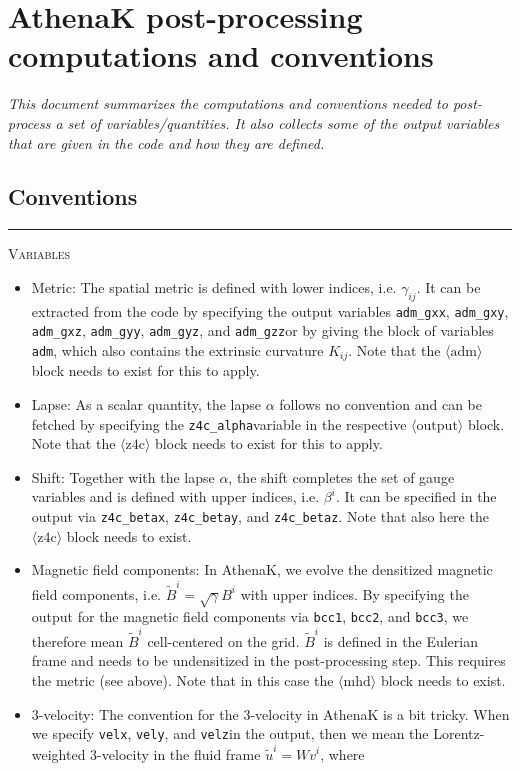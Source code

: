 \documentclass{article}
\newcommand{\var}[1]{%
  {\setlength{\fboxsep}{1.5pt}%
   \colorbox{varbg}{\textcolor{varfg}{\texttt{\small #1}}}}}
\newcommand{\step}[1]{%
  \par\medskip\noindent
  {\color{stepfg}\rule[-0.15ex]{2pt}{1.5ex}\hspace{0.5em}\scshape #1}%
  \hspace{0.75em}\ignorespaces}
\newcommand{\gxx}{\var{adm\_gxx}}
\newcommand{\gxy}{\var{adm\_gxy}}
\newcommand{\gxz}{\var{adm\_gxz}}
\newcommand{\gyy}{\var{adm\_gyy}}
\newcommand{\gyz}{\var{adm\_gyz}}
\newcommand{\gzz}{\var{adm\_gzz}}
\newcommand{\vx}{\var{velx}}
\newcommand{\vy}{\var{vely}}
\newcommand{\vz}{\var{velz}}
\newcommand{\alp}{\var{z4c\_alpha}}
\newcommand{\betx}{\var{z4c\_betax}}
\newcommand{\bety}{\var{z4c\_betay}}
\newcommand{\betz}{\var{z4c\_betaz}}
\newcommand{\Bx}{\var{bcc1}}
\newcommand{\By}{\var{bcc2}}
\newcommand{\Bz}{\var{bcc3}}
\begin{document}
\section*{AthenaK post-processing computations and conventions}
\textit{This document summarizes the computations and conventions needed
to post-process a set of variables/quantities. It also collects some of the output
variables that are given in the code and how they are defined.}

\subsection*{Conventions}
\step{Variables}
\begin{itemize}
  \item Metric: The spatial metric is defined with lower indices, i.e. $\gamma_{ij}$. It can be
  extracted from the code by specifying the output variables \gxx, \gxy, \gxz,
  \gyy, \gyz, and \gzz or by giving the block of variables \var{adm}, which
  also contains the extrinsic curvature $K_{ij}$. Note that the $\langle\mathrm{adm}\rangle$
  block needs to exist for this to apply.
  \item Lapse: As a scalar quantity, the lapse $\alpha$ follows no convention and can be fetched by specifying
  the \alp variable in the respective $\langle\mathrm{output}\rangle$ block. Note that the
  $\langle\mathrm{z4c}\rangle$ block needs to exist for this to apply.
  \item Shift: Together with the lapse $\alpha$, the shift completes the set of gauge variables and is defined
  with upper indices, i.e. $\beta^i$. It can be specified in the output via \betx, \bety,
  and \betz. Note that also here the $\langle\mathrm{z4c}\rangle$ block needs to exist.
  \item Magnetic field components: In AthenaK, we evolve the densitized magnetic field components, i.e.
  $\tilde{B}^i=\sqrt{\gamma}B^i$ with upper indices. By specifying the output for the magnetic field components
  via \Bx, \By, and \Bz, we therefore mean $\tilde{B}^i$ cell-centered on the grid. $\tilde{B}^i$ is
  defined in the Eulerian frame and needs to be undensitized in the post-processing step. This requires the metric (see above).
  Note that in this case the $\langle\mathrm{mhd}\rangle$ block needs to exist.
  \item 3-velocity: The convention for the 3-velocity in AthenaK is a bit tricky. When we specify \vx, \vy, and
  \vz in the output, then we mean the Lorentz-weighted 3-velocity in the fluid frame $\tilde{u}^i=Wv^i$, where

\end{itemize}
\end{document}
